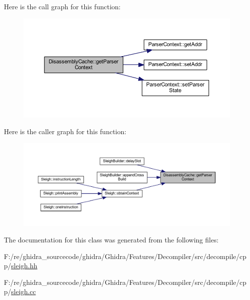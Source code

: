 Here is the call graph for this function\+:
\nopagebreak
\begin{figure}[H]
\begin{center}
\leavevmode
\includegraphics[width=350pt]{class_disassembly_cache_afab4ffc5dc52eb4cc6da82e13a1d5107_cgraph}
\end{center}
\end{figure}
Here is the caller graph for this function\+:
\nopagebreak
\begin{figure}[H]
\begin{center}
\leavevmode
\includegraphics[width=350pt]{class_disassembly_cache_afab4ffc5dc52eb4cc6da82e13a1d5107_icgraph}
\end{center}
\end{figure}


The documentation for this class was generated from the following files\+:\begin{DoxyCompactItemize}
\item 
F\+:/re/ghidra\+\_\+sourcecode/ghidra/\+Ghidra/\+Features/\+Decompiler/src/decompile/cpp/\mbox{\hyperlink{sleigh_8hh}{sleigh.\+hh}}\item 
F\+:/re/ghidra\+\_\+sourcecode/ghidra/\+Ghidra/\+Features/\+Decompiler/src/decompile/cpp/\mbox{\hyperlink{sleigh_8cc}{sleigh.\+cc}}\end{DoxyCompactItemize}
